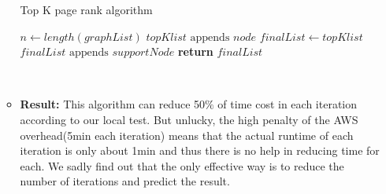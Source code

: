 \begin{itemize}
\begin{itemize}
        \begin{minipage}{\linewidth}
        \begin{algorithm}[H]
        \caption{Top K page rank algorithm}\label{euclid}
        \begin{algorithmic}[1]
        \State $n\gets length(graphList)$
         \State $topKlist \text{ appends } node$
         \EndIf
        \EndFor
        \State $finalList \gets topKlist$
          \State $finalList \text{ appends } supportNode$
          \EndIf
         \EndFor
        \EndFor
        \State \textbf{return} $finalList$
        \EndProcedure
        \end{algorithmic}
        \end{algorithm}
        \end{minipage}\\[1em]
        
        \item \textbf{Result: }  This algorithm can reduce 50$\%$ of time cost in each iteration according to our local test. But unlucky, the high penalty of the AWS overhead(5min each iteration) means that the actual runtime of each iteration is only about 1min and thus there is no help in reducing time for each. We sadly find out that the only effective way is to reduce the number of iterations and predict the result.
        
    \end{itemize}
\end{itemize}



